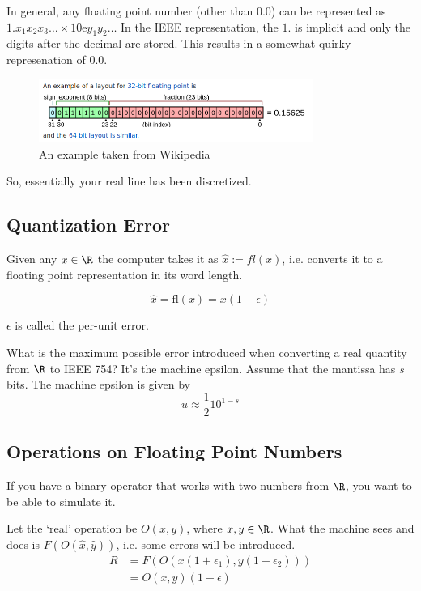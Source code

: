 In general, any floating point number (other than 0.0) can be
represented as $1.x_1x_2x_3\ldots \times 10\text{e}y_1y_2\ldots$
In the IEEE representation, the $1.$ is implicit and only the
digits after the decimal are stored. This results in a somewhat
quirky represenation of 0.0.

\begin{figure}[h]
    \centering
    \includegraphics[width=0.8\textwidth]{figures/ieee754_1.png}
    \caption{An example taken from Wikipedia}
    \label{fig:figures-ieee754_1-png}
\end{figure}

So, essentially your real line has been discretized.

\subsection*{Quantization Error}
Given any $x \in  \R$ the computer takes it as $\hat{x}:=fl(x)$,
i.e. converts it to a floating point representation in its word
length.

\begin{equation}
    \hat{x} = \text{fl}(x) = x(1+\epsilon)
\end{equation}

$\epsilon$ is called the per-unit error.

What is the maximum possible error introduced when
converting a real quantity from $\R$ to IEEE 754? It's the
machine epsilon. Assume that the mantissa has $s$ bits. The
machine epsilon is given by
\begin{equation}
    u \approx \frac{1}{2}10^{1-s}
\end{equation}

\subsection*{Operations on Floating Point Numbers}
If you have a binary operator that works with two numbers
from $\R$, you want to be able to simulate it.

Let the `real' operation be $O(x,y)$, where  $x, y \in  \R$.
What the machine sees and does is $F(O(\hat{x},\hat{y}))$,
i.e. some errors will be introduced.
\begin{equation}
    \label{fpop}
    \begin{split}
        R &= F(O(x(1 + \epsilon_1), y(1 + \epsilon_2)))\\
          &= O(x,y)(1 + \epsilon)
    \end{split}
\end{equation}

